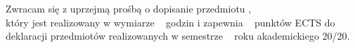 \documentclass{wmiisubmission}
\begin{document}
\cracowdate
{}
\studentaddress
\addressee{\piotrniemiec}

\vskip 3.0cm


\vskip 0.5cm

Zwracam się z uprzejmą prośbą o dopisanie przedmiotu \dotfill, \\
który jest realizowany w wymiarze \fillField{1.2cm}~ godzin i zapewnia
\fillField{1.2cm}~
punktów ECTS do deklaracji przedmiotów realizowanych w semestrze \dotfill~
roku akademickiego 20\fillField{0.7cm}/20\fillField{0.7cm}.

\vskip 2.0cm

\studentsignature

\vfill

\end{document}
